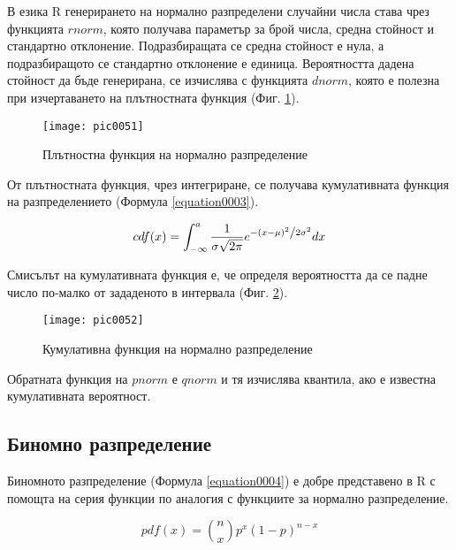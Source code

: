 В езика R генерирането на нормално разпределени случайни числа става чрез функцията $rnorm$, която получава параметър за брой числа, средна стойност и стандартно отклонение. Подразбиращата се средна стойност е нула, а подразбиращото се стандартно отклонение е единица. Вероятността дадена стойност да бъде генерирана, се изчислява с функцията $dnorm$, която е полезна при изчертаването на плътностната функция (Фиг. \ref{figure0051}).

\begin{figure}[h!]
  \centering
  \texttt{[image: pic0051]}
  \caption{Плътностна функция на нормално разпределение}
\label{figure0051}
\end{figure}
\FloatBarrier

От плътностната функция, чрез интегриране, се получава кумулативната функция на разпределението (Формула \ref{equation0003}).

\begin{equation}
cdf(x) = \int_{-\infty}^{a} \frac{1}{{\sigma \sqrt {2\pi } }}e^{{{ - \left( {x - \mu } \right)^2 } \mathord{\left/ {\vphantom {{ - \left( {x - \mu } \right)^2 } {2\sigma ^2 }}} \right. \kern-\nulldelimiterspace} {2\sigma ^2 }}} dx
\label{equation0003}
\end{equation}

Смисълът на кумулативната функция е, че определя вероятността да се падне число по-малко от зададеното в интервала (Фиг. \ref{figure0052}).

\begin{figure}[h!]
  \centering
  \texttt{[image: pic0052]}
  \caption{Кумулативна функция на нормално разпределение}
\label{figure0052}
\end{figure}
\FloatBarrier

Обратната функция на $pnorm$ е $qnorm$ и тя изчислява квантила, ако е известна кумулативната вероятност.

\subsection{Биномно разпределение}

Биномното разпределение (Формула \ref{equation0004}) е добре представено в R с помощта на серия функции по аналогия с функциите за нормално разпределение. 

\begin{equation}
pdf(x) = \binom{n}{x}p^{x}(1-p)^{n-x}
\label{equation0004}
\end{equation}

